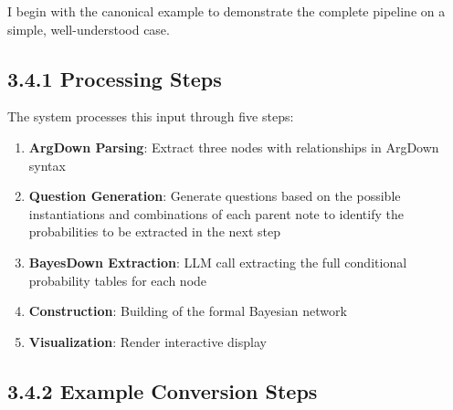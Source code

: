 \documentclass[
  11pt,
  letterpaper,
]{book}
\providecommand{\tightlist}{%
  \setlength{\itemsep}{0pt}\setlength{\parskip}{0pt}}
\begin{document}

I begin with the canonical example to demonstrate the complete pipeline
on a simple, well-understood case.

\subsection*{3.4.1 Processing Steps}\label{sec-rsg-processing}

The system processes this input through five steps:

\begin{enumerate}
\def\labelenumi{\arabic{enumi}.}
\tightlist
\item
  \textbf{ArgDown Parsing}: Extract three nodes with relationships in
  ArgDown syntax
\item
  \textbf{Question Generation}: Generate questions based on the possible
  instantiations and combinations of each parent note to identify the
  probabilities to be extracted in the next step
\item
  \textbf{BayesDown Extraction}: LLM call extracting the full
  conditional probability tables for each node
\item
  \textbf{Construction}: Building of the formal Bayesian network
\item
  \textbf{Visualization}: Render interactive display
\end{enumerate}

\subsection*{3.4.2 Example Conversion Steps}\label{sec-rsg-input}
\end{document}
